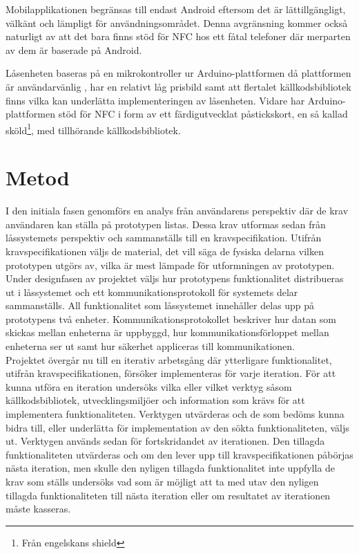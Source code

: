 \documentclass[11pt]{article}
\begin{document}
Mobilapplikationen begränsas till endast Android eftersom det är lättillgängligt, välkänt och lämpligt för användningsområdet. Denna avgränsning kommer också naturligt av att det bara finns stöd för NFC hos ett fåtal telefoner där merparten av dem är baserade på Android\parencite{online:NFC_WORLD}.

Låsenheten baseras på en mikrokontroller ur Arduino-plattformen då plattformen är användarvänlig \parencite{book:McRobert}, har en relativt låg prisbild samt att flertalet källkodsbibliotek finns vilka kan underlätta implementeringen av låsenheten. Vidare har Arduino-plattformen stöd för NFC i form av ett färdigutvecklat påstickskort, en så kallad sköld\footnote{Från engelskans shield}, med tillhörande källkodsbibliotek.


\section{Metod}
I den initiala fasen genomförs en analys från användarens perspektiv där de krav användaren kan ställa på prototypen listas. Dessa krav utformas sedan från låssystemets perspektiv och sammanställs till en kravspecifikation. Utifrån kravspecifikationen väljs de material, det vill säga de fysiska delarna vilken prototypen utgörs av, vilka är mest lämpade för utformningen av prototypen.\\
Under designfasen av projektet väljs hur prototypens funktionalitet distribueras ut i låssystemet och ett kommunikationsprotokoll för systemets delar sammanställs. All funktionalitet som låssystemet innehåller delas upp på prototypens två enheter. Kommunikationsprotokollet beskriver hur datan som skickas mellan enheterna är uppbyggd, hur kommunikationsförloppet mellan enheterna ser ut samt hur säkerhet appliceras till kommunikationen.\\
Projektet övergår nu till en iterativ arbetsgång där ytterligare funktionalitet, utifrån kravspecifikationen, försöker implementeras för varje iteration. För att kunna utföra en iteration undersöks vilka eller vilket verktyg såsom källkodsbibliotek, utvecklingsmiljöer och information som krävs för att implementera funktionaliteten. Verktygen utvärderas och de som bedöms kunna bidra till, eller underlätta för implementation av den sökta funktionaliteten, väljs ut. Verktygen används sedan för fortskridandet av iterationen. Den tillagda funktionaliteten utvärderas och om den lever upp till kravspecifikationen påbörjas nästa iteration, men skulle den nyligen tillagda funktionalitet inte uppfylla de krav som ställs undersöks vad som är möjligt att ta med utav den nyligen tillagda funktionaliteten till nästa iteration eller om resultatet av iterationen måste kasseras.
\end{document}
